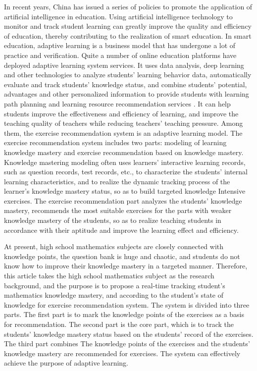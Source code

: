 In recent years, China has issued a series of policies to promote the application of artificial intelligence in education. Using artificial intelligence technology to monitor and track student learning can greatly improve the quality and efficiency of education, thereby contributing to the realization of smart education. In smart education, adaptive learning is a business model that has undergone a lot of practice and verification. Quite a number of online education platforms have deployed adaptive learning system services. It uses data analysis, deep learning and other technologies to analyze students' learning behavior data, automatically evaluate and track students' knowledge status, and combine students' potential, advantages and other personalized information to provide students with learning path planning and learning resource recommendation services . It can help students improve the effectiveness and efficiency of learning, and improve the teaching quality of teachers while reducing teachers' teaching pressure. Among them, the exercise recommendation system is an adaptive learning model. The exercise recommendation system includes two parts: modeling of learning knowledge mastery and exercise recommendation based on knowledge mastery. Knowledge mastering modeling often uses learners' interactive learning records, such as question records, test records, etc., to characterize the students' internal learning characteristics, and to realize the dynamic tracking process of the learner's knowledge mastery status, so as to build targeted knowledge Intensive exercises. The exercise recommendation part analyzes the students' knowledge mastery, recommends the most suitable exercises for the parts with weaker knowledge mastery of the students, so as to realize teaching students in accordance with their aptitude and improve the learning effect and efficiency.

At present, high school mathematics subjects are closely connected with knowledge points, the question bank is huge and chaotic, and students do not know how to improve their knowledge mastery in a targeted manner. Therefore, this article takes the high school mathematics subject as the research background, and the purpose is to propose a real-time tracking student's mathematics knowledge mastery, and according to the student's state of knowledge for exercise recommendation system. The system is divided into three parts. The first part is to mark the knowledge points of the exercises as a basis for recommendation. The second part is the core part, which is to track the students' knowledge mastery status based on the students' record of the exercises. The third part combines The knowledge points of the exercises and the students' knowledge mastery are recommended for exercises. The system can effectively achieve the purpose of adaptive learning.

